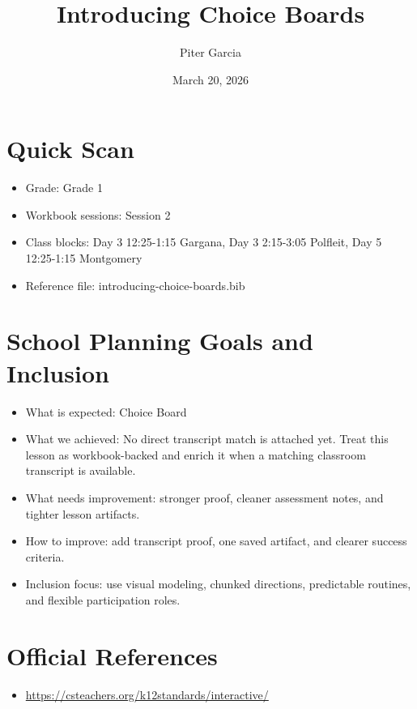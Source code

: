 \documentclass[11pt]{article}
\title{Introducing Choice Boards}
\author{Piter Garcia}
\date{March 20, 2026}
\begin{document}
\maketitle
\section*{Quick Scan}
\begin{itemize}[leftmargin=*]
\item Grade: Grade 1
\item Workbook sessions: Session 2
\item Class blocks: Day 3 12:25-1:15 Gargana, Day 3 2:15-3:05 Polfleit, Day 5 12:25-1:15 Montgomery
\item Reference file: introducing-choice-boards.bib
\end{itemize}
\section*{School Planning Goals and Inclusion}
\begin{itemize}[leftmargin=*]
\item What is expected: Choice Board
\item What we achieved: No direct transcript match is attached yet. Treat this lesson as workbook-backed and enrich it when a matching classroom transcript is available.
\item What needs improvement: stronger proof, cleaner assessment notes, and tighter lesson artifacts.
\item How to improve: add transcript proof, one saved artifact, and clearer success criteria.
\item Inclusion focus: use visual modeling, chunked directions, predictable routines, and flexible participation roles.
\end{itemize}
\section*{Official References}
\begin{itemize}[leftmargin=*]
\item \url{https://csteachers.org/k12standards/interactive/}

\end{itemize}
\end{document}
